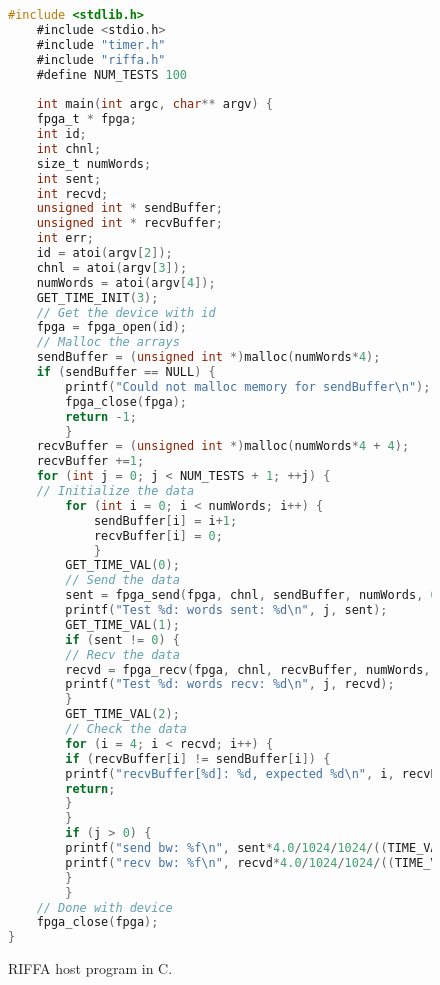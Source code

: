 \begin{figure}
	\centering	
	\begin{lstlisting}[columns=fullflexible, language=C]
	#include <stdlib.h>
	#include <stdio.h>
	#include "timer.h"
	#include "riffa.h"
	#define NUM_TESTS 100
	
	int main(int argc, char** argv) {
	fpga_t * fpga;
	int id;
	int chnl;
	size_t numWords;
	int sent;
	int recvd;
	unsigned int * sendBuffer;
	unsigned int * recvBuffer;
	int err;	
	id = atoi(argv[2]);
	chnl = atoi(argv[3]);
	numWords = atoi(argv[4]);
	GET_TIME_INIT(3);	
	// Get the device with id
	fpga = fpga_open(id);
	// Malloc the arrays
	sendBuffer = (unsigned int *)malloc(numWords*4);
	if (sendBuffer == NULL) {
		printf("Could not malloc memory for sendBuffer\n");
		fpga_close(fpga);
		return -1;
		}
	recvBuffer = (unsigned int *)malloc(numWords*4 + 4);
	recvBuffer +=1;	
	for (int j = 0; j < NUM_TESTS + 1; ++j) {
	// Initialize the data
		for (int i = 0; i < numWords; i++) {
			sendBuffer[i] = i+1;
			recvBuffer[i] = 0;
			}
		GET_TIME_VAL(0);
		// Send the data
		sent = fpga_send(fpga, chnl, sendBuffer, numWords, 0, 1, 25000);
		printf("Test %d: words sent: %d\n", j, sent);
		GET_TIME_VAL(1);	
		if (sent != 0) {
		// Recv the data
		recvd = fpga_recv(fpga, chnl, recvBuffer, numWords, 25000);
		printf("Test %d: words recv: %d\n", j, recvd);
		}	
		GET_TIME_VAL(2);	
		// Check the data
		for (i = 4; i < recvd; i++) {
		if (recvBuffer[i] != sendBuffer[i]) {
		printf("recvBuffer[%d]: %d, expected %d\n", i, recvBuffer[i], sendBuffer[i]);
		return;
		}
		}	
		if (j > 0) {
		printf("send bw: %f\n",	sent*4.0/1024/1024/((TIME_VAL_TO_MS(1) - TIME_VAL_TO_MS(0))/1000.0)); 
		printf("recv bw: %f\n",	recvd*4.0/1024/1024/((TIME_VAL_TO_MS(2) - TIME_VAL_TO_MS(1))/1000.0)); 
		}
		}
	// Done with device
	fpga_close(fpga);
}	
	\end{lstlisting}
	\caption{RIFFA host program in C.}
	\label{riffa_host_program}
\end{figure}
